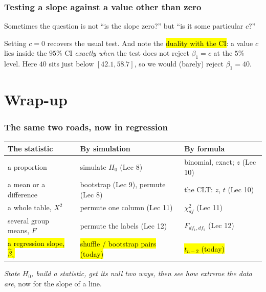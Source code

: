 \documentclass[slidestop,compress,mathserif]{beamer}
\begin{document}
\begin{frame}
\frametitle{Testing a slope against a value other than zero}

Sometimes the question is not ``is the slope zero?'' but ``is it some particular $c$?''

\vspace{0.2em}

\vspace{0.2em}
{\small Setting $c = 0$ recovers the usual test. And note the \hl{duality with the CI}: a value $c$ lies inside the $95\%$ CI \emph{exactly when} the test does not reject $\beta_1 = c$ at the $5\%$ level. Here $40$ sits just below $[42.1, 58.7]$, so we would (barely) reject $\beta_1 = 40$.}

\end{frame}


\section{Wrap-up}

\begin{frame}
\frametitle{The same two roads, now in regression}

{\scriptsize
\begin{center}
\setlength{\tabcolsep}{2.5pt}
\begin{tabular}{lll}
\toprule
\textbf{The statistic} & \textbf{By simulation} & \textbf{By formula} \\
\midrule
a proportion & simulate $H_0$ (Lec 8) & binomial, exact; $z$ (Lec 10) \\
a mean or a difference & bootstrap (Lec 9), permute (Lec 8) & the CLT: $z$, $t$ (Lec 10) \\
a whole table, $X^2$ & permute one column (Lec 11) & $\chi^2_{df}$ (Lec 11) \\
several group means, $F$ & permute the labels (Lec 12) & $F_{df_1,df_2}$ (Lec 12) \\
\hl{a regression slope, $\hat\beta_1$} & \hl{shuffle / bootstrap pairs (today)} & \hl{$t_{n-2}$ (today)} \\
\bottomrule
\end{tabular}
\end{center}}

\vspace{0.3em}
\emph{State $H_0$, build a statistic, get its null two ways, then see how extreme the data are}, now for the slope of a line.

\end{frame}
\end{document}
